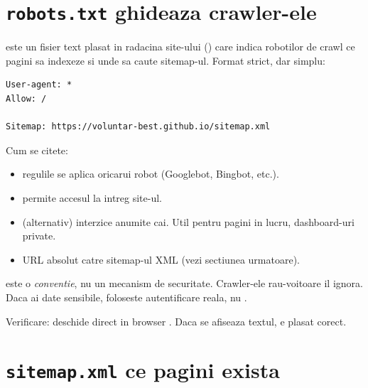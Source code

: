 \section{\texttt{robots.txt} \textendash{} ghideaza crawler-ele}

 este un fisier text plasat in radacina site-ului () care indica robotilor de crawl ce pagini sa indexeze si unde sa caute sitemap-ul. Format strict, dar simplu:

\begin{lstlisting}[caption={\texttt{robots.txt} minimal pentru GitHub Pages}, basicstyle=\ttfamily\small, backgroundcolor=\color{codeBg}, frame=leftline, framerule=2.5pt, rulecolor=\color{partcolor}, framexleftmargin=4pt, xleftmargin=14pt]
User-agent: *
Allow: /

Sitemap: https://voluntar-best.github.io/sitemap.xml
\end{lstlisting}

Cum se citete:
\begin{itemize}[itemsep=1pt]
  \item {} \textendash{} regulile se aplica oricarui robot (Googlebot, Bingbot, etc.).
  \item {} \textendash{} permite accesul la intreg site-ul.
  \item {} (alternativ) \textendash{} interzice anumite cai. Util pentru pagini in lucru, dashboard-uri private.
  \item {} \textendash{} URL absolut catre sitemap-ul XML (vezi sectiunea urmatoare).
\end{itemize}

\begin{atentie}
 este o \emph{conventie}, nu un mecanism de securitate. Crawler-ele rau-voitoare il ignora. Daca ai date sensibile, foloseste autentificare reala, nu .
\end{atentie}

\begin{ponturi}
Verificare: deschide direct in browser . Daca se afiseaza textul, e plasat corect.
\end{ponturi}

\section{\texttt{sitemap.xml} \textendash{} ce pagini exista}


